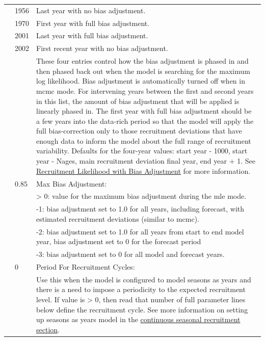 \begin{longtable}{p{1cm} p{3cm} p{12cm}}
	\Tstrut & 1956 & Last year with no bias adjustment. \\
			& 1970 & First year with full bias adjustment. \\
			& 2001 & Last year with full bias adjustment. \\
			& 2002 & First recent year with no bias adjustment. \\
			& 	   & These four entries control how the bias adjustment is phased in and then phased back out when the model is searching for the maximum log likelihood. Bias adjustment is automatically turned off when in \gls{mcmc} mode. For intervening years between the first and second years in this list, the amount of bias adjustment that will be applied is linearly phased in. The first year with full bias adjustment should be a few years into the data-rich period so that the model will apply the full bias-correction only to those recruitment deviations that have enough data to inform the model about the full range of recruitment variability. Defaults for the four-year values: start year - 1000, start year - Nages, main recruitment deviation final year, end year + 1. See \hyperlink{RecBias}{Recruitment Likelihood with Bias Adjustment} for more information. \\
	
	\Tstrut & 0.85 & Max Bias Adjustment: \\
			&	   & > 0: value for the maximum bias adjustment during the \gls{mle} mode. \\
			& 	   & -1: bias adjustment set to 1.0 for all years, including forecast, with estimated recruitment deviations (similar to \gls{mcmc}). \\
			& 	   & -2: bias adjustment set to 1.0 for all years from start to end model year, bias adjustment set to 0 for the forecast period \\
			& 	   & -3: bias adjustment set to 0 for all model and forecast years. \\

	\Tstrut & 0    & Period For Recruitment Cycles: \\
			&      & Use this when the model is configured to model seasons as years and there is a need to impose a periodicity to the expected recruitment level. If value is > 0, then read that number of full parameter lines below define the recruitment cycle. See more information on setting up seasons as years model in the \hyperlink{continuous-seasonal-recruitment-sec}{continuous seasonal recruitment section}. \\
	

\end{longtable}

